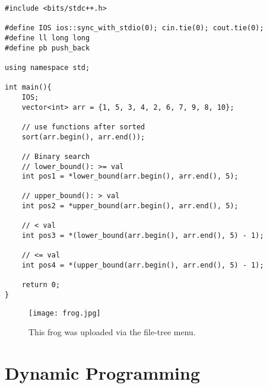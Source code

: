 \documentclass[12pt, a4paper]{article}
\begin{document}
\begin{lstlisting}
#include <bits/stdc++.h>

#define IOS ios::sync_with_stdio(0); cin.tie(0); cout.tie(0);
#define ll long long
#define pb push_back

using namespace std;

int main(){
    IOS;
    vector<int> arr = {1, 5, 3, 4, 2, 6, 7, 9, 8, 10};

    // use functions after sorted
    sort(arr.begin(), arr.end());

    // Binary search
    // lower_bound(): >= val
    int pos1 = *lower_bound(arr.begin(), arr.end(), 5);

    // upper_bound(): > val
    int pos2 = *upper_bound(arr.begin(), arr.end(), 5);

    // < val
    int pos3 = *(lower_bound(arr.begin(), arr.end(), 5) - 1);

    // <= val
    int pos4 = *(upper_bound(arr.begin(), arr.end(), 5) - 1);
    
    return 0;
}
\end{lstlisting}

\begin{figure}
\centering
\texttt{[image: frog.jpg]}
\caption{\label{fig:frog}This frog was uploaded via the file-tree menu.}
\end{figure}

\section{Dynamic Programming}
\end{document}
